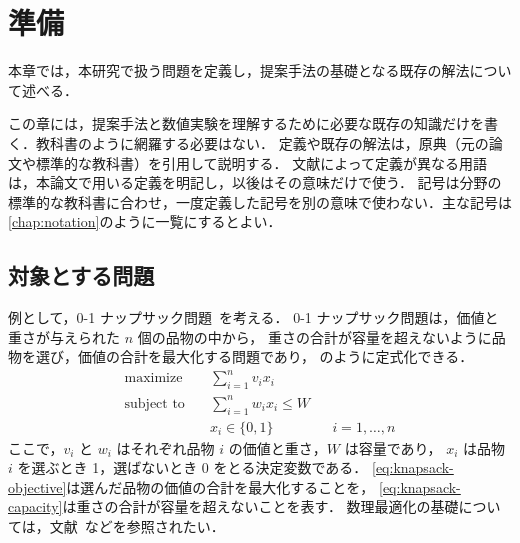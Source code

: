 \chapter{準備}
\label{chap:preliminaries}

本章では，本研究で扱う問題を定義し，提案手法の基礎となる既存の解法について述べる．
\begin{writingnote}
この章には，提案手法と数値実験を理解するために必要な既存の知識だけを書く．教科書のように網羅する必要はない．
定義や既存の解法は，原典（元の論文や標準的な教科書）を引用して説明する．
文献によって定義が異なる用語は，本論文で用いる定義を明記し，以後はその意味だけで使う．
記号は分野の標準的な教科書に合わせ，一度定義した記号を別の意味で使わない．主な記号は\cref{chap:notation}のように一覧にするとよい．
\end{writingnote}

\section{対象とする問題}
\label{sec:problem}

例として，0-1 ナップサック問題~\cite{kellerer2004knapsack}を考える．
0-1 ナップサック問題は，価値と重さが与えられた $n$ 個の品物の中から，
重さの合計が容量を超えないように品物を選び，価値の合計を最大化する問題であり，
のように定式化できる．
\begin{align}
  \text{maximize}   \quad & \sum_{i=1}^{n} v_i x_i \label{eq:knapsack-objective} \\
  \text{subject to} \quad & \sum_{i=1}^{n} w_i x_i \le W \label{eq:knapsack-capacity} \\
                          & x_i \in \{0, 1\} && i = 1, \dots, n \label{eq:knapsack-binary}
\end{align}
ここで，$v_i$ と $w_i$ はそれぞれ品物 $i$ の価値と重さ，$W$ は容量であり，
$x_i$ は品物 $i$ を選ぶとき 1，選ばないとき 0 をとる決定変数である．
\cref{eq:knapsack-objective}は選んだ品物の価値の合計を最大化することを，
\cref{eq:knapsack-capacity}は重さの合計が容量を超えないことを表す．
数理最適化の基礎については，文献~\cite{kanatani2005optimization}などを参照されたい．

